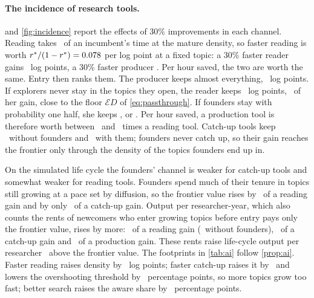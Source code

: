 \paragraph{The incidence of research tools.}  and
\cref{fig:incidence} report the effects of 30\% improvements in each channel.
Reading takes \calRm\ of an incumbent's time at the mature density, so faster
reading is worth $r^*/(1-r^*)=0.078$ per log point at a fixed topic:
a 30\% faster reader gains \calReadFixed\ log points, a 30\% faster producer
\calWriteFixed. Per hour saved, the two are worth the same. Entry then ranks
them. The producer keeps almost everything, \calWriteOut\ log points. If
explorers never stay in the topics they open, the reader keeps
\calReadOutNoF\ log points, \calReadPassNoF\ of her gain, close to the floor
$\mathcal ED$ of \eqref{eq:passthrough}. If founders stay with probability one
half, she keeps \calReadOut, or \calReadPass. Per hour saved, a production tool
is therefore worth between \calPerHour\ and \calPerHourNoF\ times a reading
tool. Catch-up tools keep \calCatchPassNoF\ without founders and \calCatchPass\
with them; founders never catch up, so their gain reaches the frontier only
through the density of the topics founders end up in.

On the simulated life cycle the founders' channel is weaker for catch-up
tools and somewhat weaker for reading tools. Founders spend much of their
tenure in topics still growing at a pace set by diffusion, so the frontier
value rises by \calLCReadF\ of a reading gain and by only \calLCCatchF\ of a
catch-up gain. Output per researcher-year, which also counts the rents of
newcomers who enter growing topics before entry pays only the frontier value,
rises by more: \calLCReadY\ of a reading gain (\calLCReadYnoF\ without founders),
\calLCCatchY\ of a catch-up gain and \calLCProdY\ of a production gain. These
rents raise life-cycle output per researcher \calLCRent\ above the frontier
value. The footprints in \cref{tab:ai} follow \cref{prop:ai}. Faster reading
raises density by \calReadDens\ log points; faster catch-up raises it by
\calCatchDens\ and lowers the overshooting threshold by \calCatchGstar\
percentage points, so more topics grow too fast; better search raises the aware
share by \calSearchAware\ percentage points.

\begin{table}[t]
\centering
\caption{How much of each tool survives entry, and readership}\label{tab:incidence}

\end{table}


